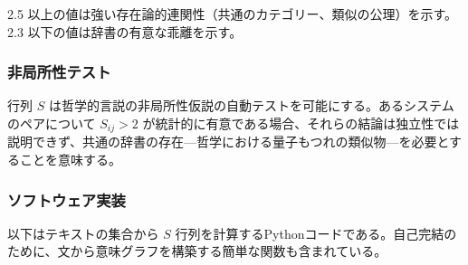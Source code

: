 \documentclass[11pt,a4paper]{article}
\begin{document}
	2.5 以上の値は強い存在論的連関性（共通のカテゴリー、類似の公理）を示す。2.3 以下の値は辞書の有意な乖離を示す。
	
	\subsubsection{非局所性テスト}
	
	行列 \(S\) は哲学的言説の非局所性仮説の自動テストを可能にする。あるシステムのペアについて \(S_{ij} > 2\) が統計的に有意である場合、それらの結論は独立性では説明できず、共通の辞書の存在—哲学における量子もつれの類似物—を必要とすることを意味する。
	
	\subsubsection{ソフトウェア実装}
	
	以下はテキストの集合から \(S\) 行列を計算するPythonコードである。自己完結のために、文から意味グラフを構築する簡単な関数も含まれている。
	
\end{document}
